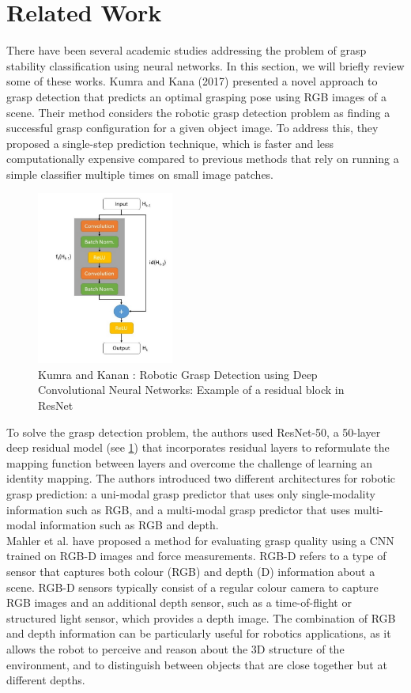 \documentclass[11pt, a4paper]{report}
\begin{document}
\section{Related Work}\label{sec:5.1}
There have been several academic studies addressing the problem of grasp stability classification using neural networks. In this section, we will briefly review some of these works. Kumra and Kana (2017) \cite{8202237} presented a novel approach to grasp detection that predicts an optimal grasping pose using RGB images of a scene. Their method considers the robotic grasp detection problem as finding a successful grasp configuration for a given object image. To address this, they proposed a single-step prediction technique, which is faster and less computationally expensive compared to previous methods that rely on running a simple classifier multiple times on small image patches.
\begin{figure}[H]
    \centering
    \includegraphics[width=0.4\textwidth]{docs/Project Report/Media/5_1_kumra_kana_2017_residual_block.png}
    \caption{Kumra and Kanan \cite{8202237}: Robotic Grasp Detection using Deep Convolutional Neural Networks: Example of a residual block in ResNet}
    \label{fig:5.1}
\end{figure}
To solve the grasp detection problem, the authors used ResNet-50, a 50-layer deep residual model (see \ref{fig:5.1}) that incorporates residual layers to reformulate the mapping function between layers and overcome the challenge of learning an identity mapping. The authors introduced two different architectures for robotic grasp prediction: a uni-modal grasp predictor that uses only single-modality information such as RGB, and a multi-modal grasp predictor that uses multi-modal information such as RGB and depth.\\


Mahler et al. \cite{mahler2017dexnet} have proposed a method for evaluating grasp quality using a CNN trained on RGB-D images and force measurements. RGB-D refers to a type of sensor that captures both colour (RGB) and depth (D) information about a scene. RGB-D sensors typically consist of a regular colour camera to capture RGB images and an additional depth sensor, such as a time-of-flight or structured light sensor, which provides a depth image. The combination of RGB and depth information can be particularly useful for robotics applications, as it allows the robot to perceive and reason about the 3D structure of the environment, and to distinguish between objects that are close together but at different depths.\\
\end{document}
